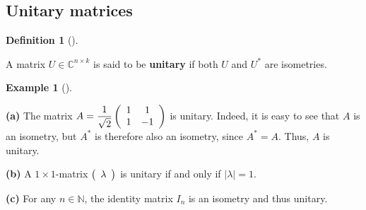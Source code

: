 \documentclass[numbers=enddot,12pt,final,onecolumn,notitlepage]{scrartcl}%
\numberwithin{exer}{subsection}
\theoremstyle{definition}
\newtheorem{defi}[theo]{Definition}
\newenvironment{definition}[1][]
{\begin{defi}[#1]\begin{leftbar}}
{\end{leftbar}\end{defi}}
\newtheorem{exam}[theo]{Example}
\newenvironment{example}[1][]
{\begin{exam}[#1]\begin{leftbar}}
{\end{leftbar}\end{exam}}
\begin{document}
\subsection{Unitary matrices}

\begin{definition}
A matrix $U\in\mathbb{C}^{n\times k}$ is said to be \textbf{unitary} if both
$U$ and $U^{\ast}$ are isometries.
\end{definition}

\begin{example}
\textbf{(a)} The matrix $A=\dfrac{1}{\sqrt{2}}\left(
\begin{array}
[c]{cc}%
1 & 1\\
1 & -1
\end{array}
\right)  $ is unitary. Indeed, it is easy to see that $A$ is an isometry, but
$A^{\ast}$ is therefore also an isometry, since $A^{\ast}=A$. Thus, $A$ is unitary.

\textbf{(b)} A $1\times1$-matrix $\left(
\begin{array}
[c]{c}%
\lambda
\end{array}
\right)  $ is unitary if and only if $\left\vert \lambda\right\vert =1$.

\textbf{(c)} For any $n\in\mathbb{N}$, the identity matrix $I_{n}$ is an
isometry and thus unitary.
\end{example}
\end{document}
